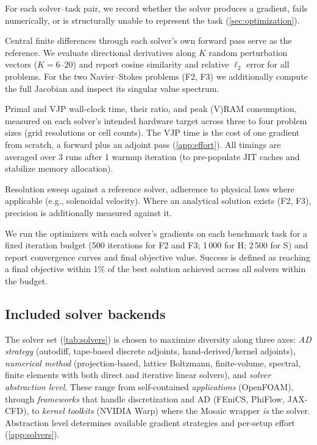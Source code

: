 \documentclass[11pt,a4paper]{article}
\begin{document}
\begin{description}\itemsep2pt
  \item[Setup compatibility.] For each solver--task pair, we record
    whether the solver produces a gradient, fails numerically, or is
    structurally unable to represent the task (\cref{sec:optimization}).
  \item[Gradient accuracy.] Central finite differences through each
    solver's own forward pass serve as the reference. We
    evaluate directional derivatives along $K$ random perturbation
    vectors ($K{=}6$--$20$) and report cosine similarity and relative
    $\ell_2$ error for all problems. For the two Navier--Stokes
    problems (F2, F3) we additionally compute the full Jacobian and
    inspect its singular value spectrum.
  \item[Performance.] Primal and VJP wall-clock time, their ratio, and
    peak (V)RAM consumption, measured on each solver's intended hardware
    target across three to four problem sizes (grid resolutions or cell counts).
    The VJP time is the cost of one gradient from scratch, a forward plus an
    adjoint pass (\cref{app:effort}).
    All timings are averaged over 3 runs after 1 warmup iteration
    (to pre-populate JIT caches and stabilize memory allocation).
  \item[Forward accuracy.] Resolution sweep against a reference solver,
    adherence to physical laws where applicable (e.g., solenoidal
    velocity). Where an analytical solution exists (F2, F3),
    precision is additionally measured against it.
  \item[Optimization convergence.] We run the optimizers with each solver's
    gradients on each benchmark task for a fixed iteration budget
    (500 iterations for F2 and F3; 1\,000 for H; 2\,500 for S) and report convergence
    curves and final objective value. Success is defined as reaching a
    final objective within 1\% of the best solution achieved across all
    solvers within the budget.
\end{description}

\subsection{Included solver backends}
\label{sec:solvers}

The solver set (\cref{tab:solvers}) is chosen to maximize diversity
along three axes: \emph{AD strategy} (autodiff, tape-based discrete
adjoints, hand-derived/kernel adjoints), \emph{numerical method} (projection-based, lattice Boltzmann,
finite-volume, spectral, finite elements with both direct and iterative
linear solvers), and \emph{solver abstraction level}.
These range from self-contained \emph{applications} (OpenFOAM),
through \emph{frameworks} that handle discretization and AD (FEniCS,
PhiFlow, JAX-CFD), to \emph{kernel toolkits} (NVIDIA Warp) where the
Mosaic wrapper \emph{is} the solver. Abstraction level determines
available gradient strategies and per-setup effort
(\cref{app:solvers}).
\end{document}
